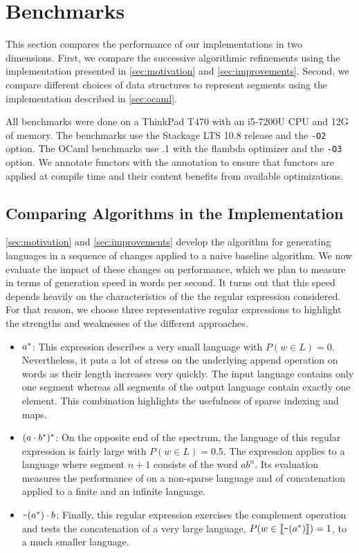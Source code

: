\section{Benchmarks}
\label{sec:bench}

This section compares the performance of our implementations in two dimensions.
First, we compare the successive algorithmic refinements using the \haskell
implementation presented in \cref{sec:motivation} and \cref{sec:improvements}.
Second, we compare different choices of data structures to represent segments
using the \ocaml implementation described in \cref{sec:ocaml}.

All benchmarks were done on a ThinkPad T470 with an i5-7200U CPU and 12G of memory.
The \haskell benchmarks use the Stackage LTS 10.8 release and the \texttt{-O2} option.
The OCaml benchmarks use .1 with the flambda optimizer and the
\texttt{-O3} option. We annotate functors
with the \code{[@inline]} annotation to ensure that functors are applied at
compile time and their content benefits from available optimizations.

\subsection{Comparing Algorithms in the \haskell Implementation}

\cref{sec:motivation} and \cref{sec:improvements} develop the
algorithm for generating languages in a sequence of changes applied to
a naive baseline algorithm. We now evaluate the impact of these
changes on performance, which we plan to measure in terms of
generation speed in words per second. It turns out that this speed
depends heavily on the characteristics of the the regular expression
considered. For that reason, we choose three representative regular expressions to highlight the
strengths and weaknesses of the different approaches.
\begin{itemize}
\item $a^*$: This expression describes a very small language with $P (w\in L) = 0$.
  Nevertheless, it puts a lot of stress on the underlying
  append operation on words as their length increases very quickly.
  The input language contains only one segment whereas all segments of
  the output language contain exactly one element. This combination
  highlights the usefulness of sparse indexing and maps.
\item $(a \cdot{b^*})^*$: On the opposite end of the
  spectrum, the language of this regular expression is fairly large
  with $P (w\in L)=0.5$. The expression applies  to a
  language where segment $n+1$ consists of the word $ab^n$. Its
  evaluation measures the performance of  on a non-sparse
  language and of {concatenation} applied to a finite and an infinite
  language.
\item $\texttt{\textasciitilde}{(a^*)} \cdot{b}$: Finally, this regular
  expression exercises the complement operation and tests the
  concatenation of a very large language, 
  $P (w\in \llbracket\texttt{\textasciitilde}{(a^*)}\rrbracket) = 1$, to a much smaller
  language.
\end{itemize}

